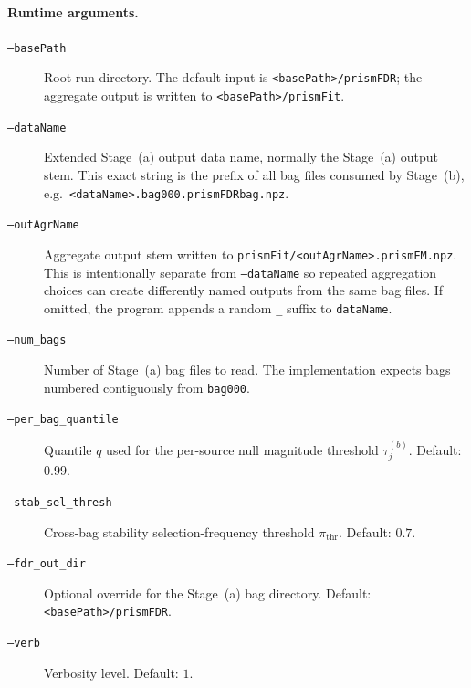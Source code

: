 \documentclass[11pt]{article}
\begin{document}
\paragraph{Runtime arguments.}
\begin{description}
  \item[\texttt{--basePath}] Root run directory. The default input is
  \texttt{<basePath>/prismFDR}; the aggregate output is written to
  \texttt{<basePath>/prismFit}.
  \item[\texttt{--dataName}] Extended Stage~(a) output data name, normally
  the Stage~(a) output stem. This exact string is the prefix of
  all bag files consumed by Stage~(b), e.g.\
  \texttt{<dataName>.bag000.prismFDRbag.npz}.
  \item[\texttt{--outAgrName}] Aggregate output stem written to
  \texttt{prismFit/<outAgrName>.prismEM.npz}. This is intentionally separate
  from \texttt{--dataName} so repeated aggregation choices can create
  differently named outputs from the same bag files. If omitted, the program
  appends a random \texttt{\_<hash4>} suffix to \texttt{dataName}.
  \item[\texttt{--num\_bags}] Number of Stage~(a) bag files to read. The
  implementation expects bags numbered contiguously from \texttt{bag000}.
  \item[\texttt{--per\_bag\_quantile}] Quantile \(q\) used for the per-source
  null magnitude threshold \(\tau^{(b)}_j\). Default: \(0.99\).
  \item[\texttt{--stab\_sel\_thresh}] Cross-bag stability selection-frequency threshold
  \(\pi_{\text{thr}}\). Default: \(0.7\).
  \item[\texttt{--fdr\_out\_dir}] Optional override for the Stage~(a) bag
  directory. Default: \texttt{<basePath>/prismFDR}.
  \item[\texttt{--verb}] Verbosity level. Default: \(1\).
\end{description}
\end{document}
